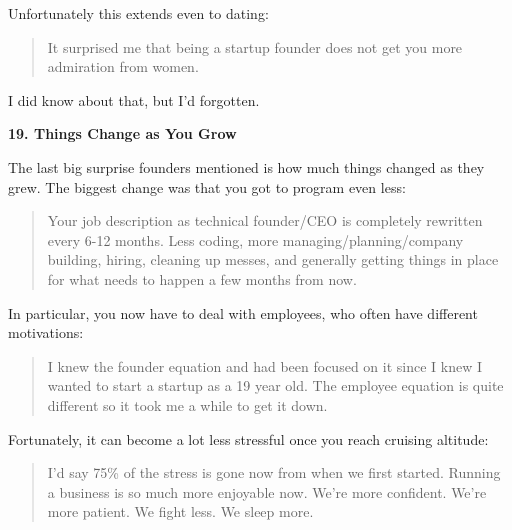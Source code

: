                   Unfortunately this extends even to dating:
                  \begin{quote}

                    It surprised me that being a startup founder does not get
                    you more admiration from women.
                  
\end{quote}

                  I did know about that, but I'd forgotten.


                  \textbf{19. Things Change as You Grow}

The last big
                  surprise founders mentioned is how much things changed as they
                  grew. The biggest change was that you got to program even
                  less:
                  \begin{quote}

                    Your job description as technical founder/CEO is completely
                    rewritten every 6-12 months. Less coding, more
                    managing/planning/company building, hiring, cleaning up
                    messes, and generally getting things in place for what needs
                    to happen a few months from now.
                  
\end{quote}

                  In particular, you now have to deal with employees, who often
                  have different motivations:
                  \begin{quote}

                    I knew the founder equation and had been focused on it since
                    I knew I wanted to start a startup as a 19 year old. The
                    employee equation is quite different so it took me a while
                    to get it down.
                  
\end{quote}

                  Fortunately, it can become a lot less stressful once you reach
                  cruising altitude:
                  \begin{quote}

                    I'd say 75\% of the stress is gone now from when we first
                    started. Running a business is so much more enjoyable now.
                    We're more confident. We're more patient. We fight less. We
                    sleep more.
                  
\end{quote}

